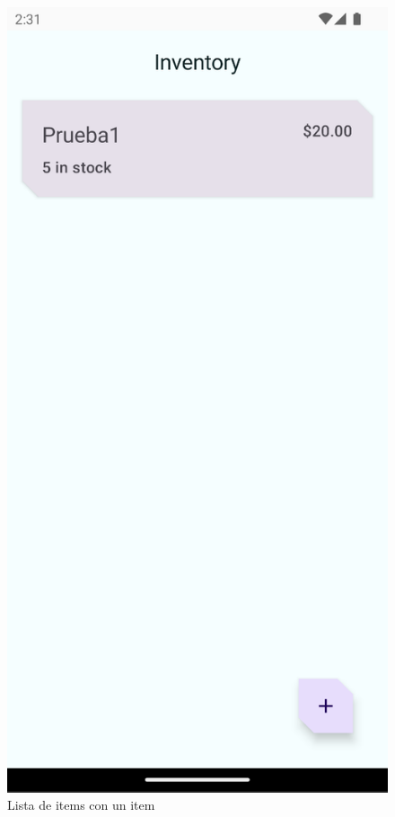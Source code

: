 \documentclass{article}
\begin{document}
        \begin{figure}[H]
            \centerline{\includegraphics[scale=0.3]{codelab2_3.png}}
            \caption{Lista de items con un item}
            \label{fig:codelab2_3}
        \end{figure}
\end{document}
